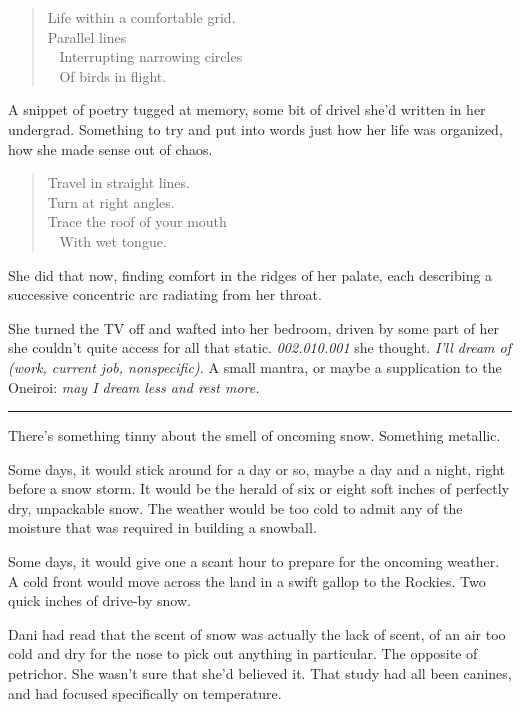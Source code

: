 \begin{quote}
Life within a comfortable grid.\\
Parallel lines\\
\hspace*{0.333em} ~ Interrupting narrowing circles\\
\hspace*{0.333em} ~ Of birds in flight.
\end{quote}

A snippet of poetry tugged at memory, some bit of drivel she'd written in her undergrad. Something to try and put into words just how her life was organized, how she made sense out of chaos.

\begin{quote}
Travel in straight lines.\\
Turn at right angles.\\
Trace the roof of your mouth\\
\hspace*{0.333em} ~ With wet tongue.
\end{quote}

She did that now, finding comfort in the ridges of her palate, each describing a successive concentric arc radiating from her throat.

She turned the TV off and wafted into her bedroom, driven by some part of her she couldn't quite access for all that static. \emph{002.010.001} she thought. \emph{I'll dream of (work, current job, nonspecific).} A small mantra, or maybe a supplication to the Oneiroi: \emph{may I dream less and rest more.}

\begin{center}\rule{0.5\linewidth}{\linethickness}\end{center}

There's something tinny about the smell of oncoming snow. Something metallic.

Some days, it would stick around for a day or so, maybe a day and a night, right before a snow storm. It would be the herald of six or eight soft inches of perfectly dry, unpackable snow. The weather would be too cold to admit any of the moisture that was required in building a snowball.

Some days, it would give one a scant hour to prepare for the oncoming weather. A cold front would move across the land in a swift gallop to the Rockies. Two quick inches of drive-by snow.

Dani had read that the scent of snow was actually the lack of scent, of an air too cold and dry for the nose to pick out anything in particular. The opposite of petrichor. She wasn't sure that she'd believed it. That study had all been canines, and had focused specifically on temperature.

